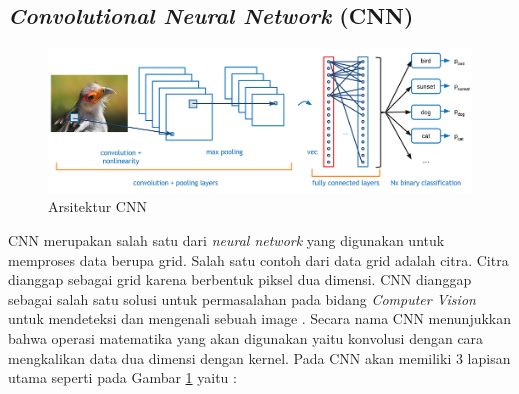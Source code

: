 \subsection{\textit{Convolutional Neural Network} (CNN)}
\begin{figure}[!h]
  \centering
  \includegraphics[width=1\linewidth]{../Gambar/cnn.png}
  \caption{Arsitektur CNN \parencite{adit}}
  \label{fig:cnn}
\end{figure}
CNN merupakan salah satu dari \textit{neural network} yang digunakan untuk memproses data berupa grid. Salah satu contoh dari data grid adalah citra. Citra dianggap sebagai grid karena berbentuk piksel dua dimensi. CNN dianggap sebagai salah satu solusi untuk permasalahan pada bidang \textit{Computer Vision} untuk mendeteksi dan mengenali sebuah image \parencite{CNN}. Secara nama CNN menunjukkan bahwa operasi matematika yang akan digunakan yaitu konvolusi dengan cara mengkalikan data dua dimensi dengan kernel. Pada CNN akan memiliki 3 lapisan utama seperti pada Gambar \ref*{fig:cnn} yaitu :
